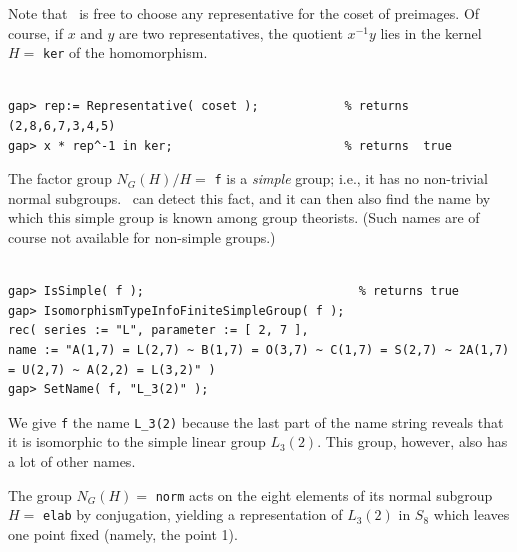 \noindent Note that \gap\ is free to choose any representative for the coset of preimages. Of
course, if $x$ and $y$ are two representatives, the quotient $x^{-1}y$ lies in the
kernel $H= $ {\tt ker} of the homomorphism.
{\codesize
\begin{verbatim}

gap> rep:= Representative( coset );            % returns  (2,8,6,7,3,4,5)
gap> x * rep^-1 in ker;                        % returns  true

\end{verbatim}}
\noindent The factor group $ N_G(H)/H = $ {\tt f} is a \emph{simple} group; i.e., it has no non-trivial normal
subgroups. 
\gap\ can detect this fact, and it can then also find the name by which this simple
group is known among group theorists. (Such names are of course not available for
non-simple groups.)
{\codesize
\begin{verbatim}

gap> IsSimple( f );                              % returns true
gap> IsomorphismTypeInfoFiniteSimpleGroup( f );  
rec( series := "L", parameter := [ 2, 7 ],
name := "A(1,7) = L(2,7) ~ B(1,7) = O(3,7) ~ C(1,7) = S(2,7) ~ 2A(1,7) = U(2,7) ~ A(2,2) = L(3,2)" )
gap> SetName( f, "L_3(2)" );

\end{verbatim}}
\noindent We give {\tt f} the name \verb!L_3(2)! because the last part of the name string reveals that it is isomorphic to the
simple linear group $L_3(2)$. This group, however, also has a lot of other names. 

The group $N_G(H)= $ {\tt norm} acts on the eight elements of its normal subgroup $H
= $ {\tt elab} by conjugation, yielding a representation
of $L_3(2)$ in $S_8$ which leaves one point fixed (namely, the point 1).

